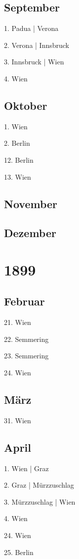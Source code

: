 \documentclass[twoside=false,titlepage=false,open=any, parskip=never, fontsize=10pt, headings=small, chapterprefix=false, appendixprefix=false, DIV=15]{scrbook}
\begin{document}
\begin{multicols}{3}
            \section*{September}
            1. Padua | Verona\par
            2. Verona | Innsbruck\par
            3. Innsbruck | Wien\par
            4. Wien\par
            \section*{Oktober}
            1. Wien\par
            2. Berlin\par
            12. Berlin\par
            13. Wien\par
            \section*{November}
            \section*{Dezember}
            \chapter*{1899}
            \section*{Februar}
            21. Wien\par
            22. Semmering\par
            23. Semmering\par
            24. Wien\par
            \section*{März}
            31. Wien\par
            \section*{April}
            1. Wien | Graz\par
            2. Graz | Mürzzuschlag\par
            3. Mürzzuschlag | Wien\par
            4. Wien\par
            24. Wien\par
            25. Berlin\par

\end{multicols}
\end{document}
